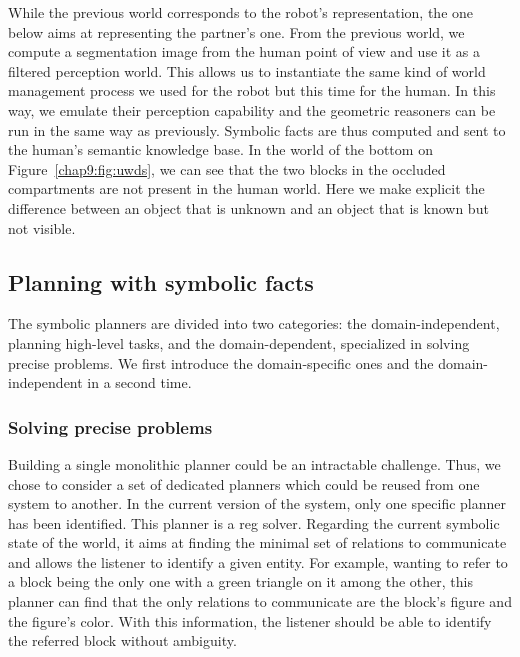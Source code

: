 \documentclass[a4paper,11pt,twoside]{StyleThese}
\begin{document}
While the previous world corresponds to the robot's representation, the one below aims at representing the partner's one. From the previous world, we compute a segmentation image from the human point of view and use it as a filtered perception world. This allows us to instantiate the same kind of world management process we used for the robot but this time for the human. In this way, we emulate their perception capability and the geometric reasoners can be run in the same way as previously. Symbolic facts are thus computed and sent to the human's semantic knowledge base. In the world of the bottom on Figure~\ref{chap9:fig:uwds}, we can see that the two blocks in the occluded compartments are not present in the human world. Here we make explicit the difference between an object that is unknown and an object that is known but not visible.


\subsection{Planning with symbolic facts}

The symbolic planners are divided into two categories: the domain-independent, planning high-level tasks, and the domain-dependent, specialized in solving precise problems. We first introduce the domain-specific ones and the domain-independent in a second time.%

\subsubsection{Solving precise problems}

Building a single monolithic planner could be an intractable challenge. Thus, we chose to consider a set of dedicated planners which could be reused from one system to another. In the current version of the system, only one specific planner has been identified. This planner is a \acrfull{reg} solver. Regarding the current symbolic state of the world, it aims at finding the minimal set of relations to communicate and allows the listener to identify a given entity. For example, wanting to refer to a block being the only one with a green triangle on it among the other, this planner can find that the only relations to communicate are the block's figure and the figure's color. With this information, the listener should be able to identify the referred block without ambiguity.
\end{document}
